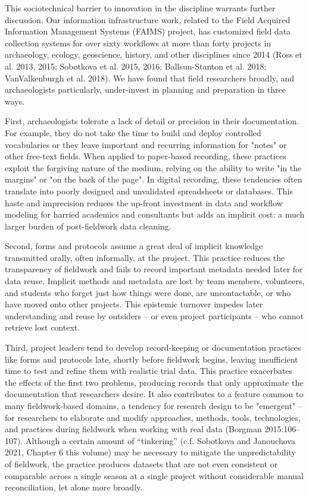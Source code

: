 \documentclass[article]{sa}
\begin{document}
This sociotechnical barrier to innovation in the discipline warrants
further discussion. Our information infrastructure work, related to the
Field Acquired Information Management Systems (FAIMS) project, has
customized field data collection systems for over sixty workflows at
more than forty projects in archaeology, ecology, geoscience, history,
and other disciplines since 2014 (Ross et al. 2013, 2015; Sobotkova et
al. 2015, 2016; Ballsun-Stanton et al. 2018; VanValkenburgh et al.
2018). We have found that field researchers broadly, and archaeologists
particularly, under-invest in planning and preparation in three ways.

First, archaeologists tolerate a lack of detail or precision in their
documentation. For example, they do not take the time to build and
deploy controlled vocabularies or they leave important and recurring
information for "notes" or other free-text fields. When applied to
paper-based recording, these practices exploit the forgiving nature of
the medium, relying on the ability to write "in the margins" or "on the
back of the page". In digital recording, these tendencies often
translate into poorly designed and unvalidated spreadsheets or
databases. This haste and imprecision reduces the up-front investment in
data and workflow modeling for harried academics and consultants but
adds an implicit cost: a much larger burden of post-fieldwork data
cleaning.

Second, forms and protocols assume a great deal of implicit knowledge
transmitted orally, often informally, at the project. This practice
reduces the transparency of fieldwork and fails to record important
metadata needed later for data reuse. Implicit methods and metadata are
lost by team members, volunteers, and students who forget just how
things were done, are uncontactable, or who have moved onto other
projects. This epistemic turnover impedes later understanding and reuse
by outsiders -- or even project participants -- who cannot retrieve lost
context.

Third, project leaders tend to develop record-keeping or documentation
practices like forms and protocols late, shortly before fieldwork
begins, leaving insufficient time to test and refine them with realistic
trial data. This practice exacerbates the effects of the first two
problems, producing records that only approximate the documentation that
researchers desire. It also contributes to a feature common to many
fieldwork-based domains, a tendency for research design to be "emergent"
-- for researchers to elaborate and modify approaches, methods, tools,
technologies, and practices during fieldwork when working with real data
(Borgman 2015:106--107). Although a certain amount of ``tinkering''
(c.f. Sobotkova and Janouchova 2021, Chapter 6 this volume) may be
necessary to mitigate the unpredictability of fieldwork, the practice
produces datasets that are not even consistent or comparable across a
single season at a single project without considerable manual
reconciliation, let alone more broadly.
\end{document}
